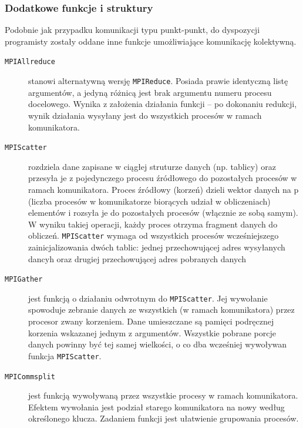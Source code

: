 \subsubsection{Dodatkowe funkcje i struktury}

Podobnie jak przypadku komunikacji typu punkt-punkt, do dyspozycji programisty zostały oddane inne funkcje umożliwiające komunikację kolektywną.

\begin{description}
	\item[\texttt{MPI\textunderscore Allreduce}] stanowi alternatywną wersję \texttt{MPI\textunderscore Reduce}. Posiada prawie identyczną listę argumentów, a jedyną różnicą jest brak argumentu numeru procesu docelowego. Wynika z założenia działania funkcji -- po dokonaniu redukcji, wynik działania wysyłany jest do wszystkich procesów w ramach komunikatora.
	\item[\texttt{MPI\textunderscore Scatter}] rozdziela dane zapisane w ciągłej struturze danych (np. tablicy) oraz przesyła je z pojedynczego procesu źródłowego do pozostałych procesów w ramach komunikatora. Proces źródłowy (korzeń) dzieli wektor danych na p (liczba procesów w komunikatorze biorących udział w obliczeniach) elementów i rozsyła je do pozostałych procesów (włącznie ze sobą samym). W wyniku takiej operacji, każdy proces otrzyma fragment danych do obliczeń. \texttt{MPI\textunderscore Scatter} wymaga od wszystkich procesów wcześniejszego zainicjalizowania dwóch tablic: jednej przechowującej adres wysyłanych dancyh oraz drugiej przechowującej adres pobranych danych
	\item[\texttt{MPI\textunderscore Gather}] jest funkcją o działaniu odwrotnym do \texttt{MPI\textunderscore Scatter}. Jej wywołanie spowoduje zebranie danych ze wszystkich (w ramach komunikatora) przez procesor zwany korzeniem. Dane umieszczane są pamięci podręcznej korzenia wskazanej jednym z argumentów. Wszystkie pobrane porcje danych powinny być tej samej wielkości, o co dba wcześniej wywoływan funkcja \texttt{MPI\textunderscore Scatter}.
	\item[\texttt{MPI\textunderscore Comm\textunderscore split}] jest funkcją wywoływaną przez wszystkie procesy w ramach komunikatora. Efektem wywołania jest podział starego komunikatora na nowy według określonego klucza. Zadaniem funkcji jest ułatwienie grupowania procesów.
\end{description}
